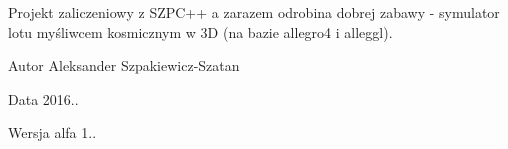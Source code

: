 Projekt zaliczeniowy z S\+Z\+P\+C++ a zarazem odrobina dobrej zabawy -\/ symulator lotu myśliwcem kosmicznym w 3D (na bazie allegro4 i alleggl). \begin{DoxyAuthor}{Autor}
Aleksander Szpakiewicz-\/\+Szatan 
\end{DoxyAuthor}
\begin{DoxyDate}{Data}
2016.. 
\end{DoxyDate}
\begin{DoxyVersion}{Wersja}
alfa 1.. 
\end{DoxyVersion}

